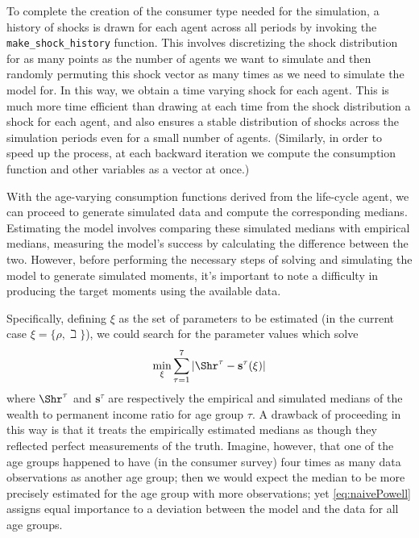 \documentclass[titlepage, headings=optiontotocandhead]{econtex}
\begin{document}
To complete the creation of the consumer type needed for the simulation, a history of shocks is drawn for each agent across all periods by invoking the \texttt{make\_shock\_history} function. This involves discretizing the shock distribution for as many points as the number of agents we want to simulate and then randomly permuting this shock vector as many times as we need to simulate the model for. In this way, we obtain a time varying shock for each agent. This is much more time efficient than drawing at each time from the shock distribution a shock for each agent, and also ensures a stable distribution of shocks across the simulation periods even for a small number of agents. (Similarly, in order to speed up the process, at each backward iteration we compute the consumption function and other variables as a vector at once.)

With the age-varying consumption functions derived from the life-cycle agent, we can proceed to generate simulated data and compute the corresponding medians.  Estimating the model involves comparing these simulated medians with empirical medians, measuring the model's success by calculating the difference between the two.  However, before performing the necessary steps of solving and simulating the model to generate simulated moments, it's important to note a difficulty in producing the target moments using the available data.

Specifically, defining $\xi$ as the set of parameters
to be estimated (in the current case $\xi =\{\rho ,\beth\}$), we could search for
the parameter values which solve
  \begin{equation}
    \begin{gathered}
      \begin{aligned}
        \min_{\xi} \sum_{\tau=1}^{7} |\Shr^{\tau} -\mathbf{s}^{\tau}(\xi)|  \label{eq:naivePowell}
      \end{aligned}
    \end{gathered}
  \end{equation}
where $\Shr^{\tau }$ and $\mathbf{s}^{\tau}$ are respectively the empirical
and simulated medians of the wealth to permanent income ratio for age group $\tau$.
A drawback of proceeding in this way is that it treats the empirically
estimated medians as though they reflected perfect measurements of the
truth. Imagine, however, that one of the age groups happened to have
(in the consumer survey) four times as many data observations as
another age group; then we would expect the median to be more
precisely estimated for the age group with more observations; yet
\eqref{eq:naivePowell} assigns equal importance to a deviation between
the model and the data for all age groups.
\end{document}
